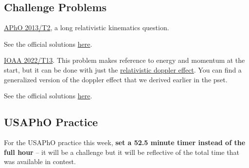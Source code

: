 \documentclass[11pt]{scrartcl}
\newcommand{\officialsol}[1]{See the official solutions \href{#1}{here}.}
\begin{document}
\subsection{Challenge Problems}

\begin{prob}
    \href{https://apho.olimpicos.net/pdf/APhO_2013_Q2.pdf}{APhO 2013/T2}, a long relativistic kinematics question.
\end{prob}
\begin{sol}
    \officialsol{https://apho.olimpicos.net/pdf/APhO_2013_S2.pdf}
\end{sol}

\begin{prob}
    \href{https://drive.google.com/file/d/1HBcRaNfGWOYGUf1aMkmCK21Y77eAEU4i/view?usp=sharing}{IOAA 2022/T13}. This problem makes reference to energy and momentum at the start, but it can be done with just the \href{https://en.wikipedia.org/wiki/Relativistic_Doppler_effect}{relativistic doppler effect}. You can find a generalized version of the doppler effect that we derived earlier in the pset.
\end{prob}
\begin{sol}
    \officialsol{https://drive.google.com/file/d/1i3oIgC4eyskJXH9GdNj5VQacB8AXgxs2/view?usp=drive_link}
\end{sol}

\subsection{USAPhO Practice}

For the USAPhO practice this week, \textbf{set a 52.5 minute timer instead of the full hour} -- it will be a challenge but it will be reflective of the total time that was available in contest.
\end{document}
